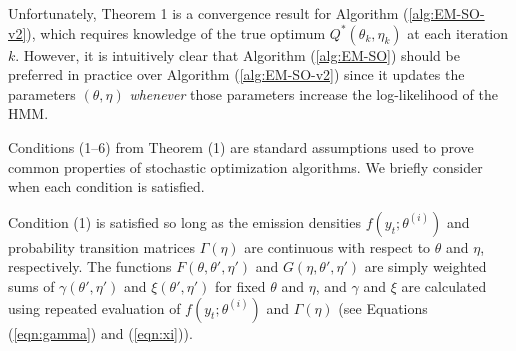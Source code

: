 


Unfortunately, Theorem 1 is a convergence result for Algorithm (\ref{alg:EM-SO-v2}), which requires knowledge of the true optimum $Q^*(\theta_{k},\eta_{k})$ at each iteration $k$. However, it is intuitively clear that Algorithm (\ref{alg:EM-SO}) should be preferred in practice over Algorithm (\ref{alg:EM-SO-v2}) since it updates the parameters $(\theta,\eta)$ \textit{whenever} those parameters increase the log-likelihood of the HMM.

Conditions (1--6) from Theorem (1) are standard assumptions used to prove common properties of stochastic optimization algorithms. We briefly consider when each condition is satisfied.

Condition (1) is satisfied so long as the emission densities $f(y_t;\theta^{(i)})$ and probability transition matrices $\Gamma(\eta)$ are continuous with respect to $\theta$ and $\eta$, respectively. The functions $F(\theta,\theta',\eta')$ and $G(\eta,\theta',\eta')$ are simply weighted sums of $\gamma(\theta',\eta')$ and $\xi(\theta',\eta')$ for fixed $\theta$ and $\eta$, and $\gamma$ and $\xi$ are calculated using repeated evaluation of $f(y_t;\theta^{(i)})$ and $\Gamma(\eta)$ (see Equations (\ref{eqn:gamma}) and (\ref{eqn:xi})).


